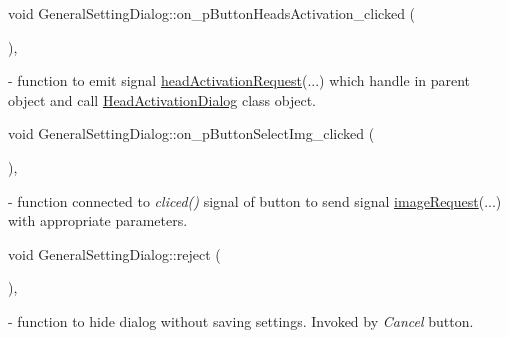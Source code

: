 \mbox{\label{classGeneralSettingDialog_a8b72a332c8c98096b1f15cf1fd6b01be}} 
{\footnotesize\ttfamily void General\+Setting\+Dialog\+::\texorpdfstring{on\+\_\+p\+Button\+Heads\+Activation\+\_\+clicked}{on\_pButtonHeadsActivation\_clicked} (\begin{DoxyParamCaption}{ }\end{DoxyParamCaption}){\ttfamily [private]}, {\ttfamily [slot]}} - function to emit signal \hyperlink{classGeneralSettingDialog_a386763acc4545a1c03542ef71601c23c}{head\+Activation\+Request}(...) which handle in parent object and call \hyperlink{classHeadActivationDialog}{Head\+Activation\+Dialog} class object.

\mbox{\label{classGeneralSettingDialog_a28115db3d9b5197703e789ac6cac8c9a}} 
{\footnotesize\ttfamily void General\+Setting\+Dialog\+::\texorpdfstring{on\+\_\+p\+Button\+Select\+Img\+\_\+clicked}{on\_pButtonSelectImg\_clicked} (\begin{DoxyParamCaption}{ }\end{DoxyParamCaption}){\ttfamily [private]}, {\ttfamily [slot]}} - function connected to \textit{cliced()} signal of button to send signal \hyperlink{classGeneralSettingDialog_a1c6ff8e8d7b1ad5f4399942ea48dc9d8}{image\+Request}(...) with appropriate parameters.

\mbox{\label{classGeneralSettingDialog_a2f4495a0f2911e41d3eaeec00949bde8}} 
{\footnotesize\ttfamily void General\+Setting\+Dialog\+::\texorpdfstring{reject}{reject} (\begin{DoxyParamCaption}{ }\end{DoxyParamCaption}){\ttfamily [private]}, {\ttfamily [slot]}} - function to hide dialog without saving settings. Invoked by \textit{Cancel} button.

